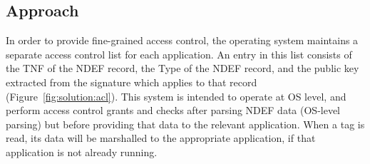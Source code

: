 \documentclass[12pt]{article}
\begin{document}
\subsection{Approach}
In order to provide fine-grained access control, the operating system maintains a separate access control list for each application.
An entry in this list consists of the TNF of the NDEF record, the Type of the NDEF record, and the public key extracted from the signature which applies to that record (Figure~\ref{fig:solution:acl}).
This system is intended to operate at OS level, and perform access control grants and checks after parsing NDEF data (OS-level parsing) but before providing that data to the relevant application.
When a tag is read, its data will be marshalled to the appropriate application, if that application is not already running.
\end{document}
